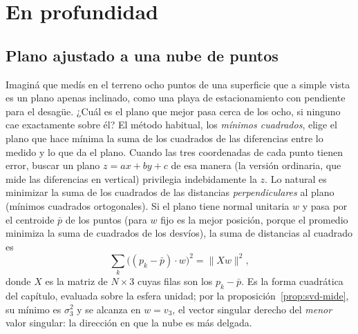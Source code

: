 \section{En profundidad}

\subsection{Plano ajustado a una nube de puntos}

Imaginá que medís en el terreno ocho puntos de una superficie que a simple vista es un plano
apenas inclinado, como una playa de estacionamiento con pendiente para el desagüe.
¿Cuál es el plano que mejor pasa cerca de los ocho, si ninguno cae exactamente sobre él?
El método habitual, los \emph{mínimos cuadrados}, elige el plano que hace mínima la suma de los
cuadrados de las diferencias entre lo medido y lo que da el plano. Cuando las tres coordenadas
de cada punto tienen error, buscar un plano \(z=ax+by+c\) de esa manera (la versión ordinaria, que mide las diferencias en vertical)
privilegia indebidamente la \(z\). Lo natural es minimizar la suma de los cuadrados de las
distancias \emph{perpendiculares} al plano (mínimos cuadrados ortogonales). Si el plano tiene
normal unitaria \(w\) y pasa por el centroide \(\bar p\) de los puntos (para \(w\) fijo es la
mejor posición, porque el promedio minimiza la suma de cuadrados de los desvíos), la suma de
distancias al cuadrado es
\[
  \sum_k\big((p_k-\bar p)\cdot w\big)^2=\|Xw\|^2 ,
\]
donde \(X\) es la matriz de \(N\times3\) cuyas filas son los \(p_k-\bar p\). Es la forma
cuadrática del capítulo, evaluada sobre la esfera unidad; por la
proposición~\ref{prop:svd-mide}, su mínimo es \(\sigma_3^2\) y se alcanza en \(w=v_3\), el
vector singular derecho del \emph{menor} valor singular: la dirección en que la nube es más
delgada.

